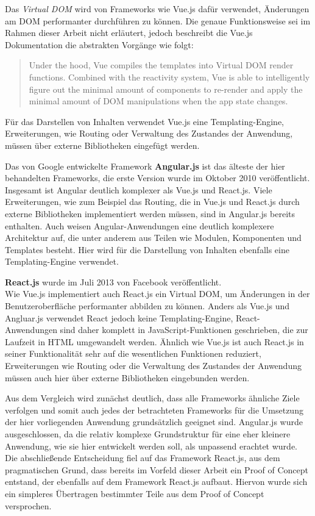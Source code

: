 Das \textit{Virtual DOM} wird von Frameworks wie Vue.js dafür verwendet, Änderungen am DOM performanter durchführen zu können. Die genaue Funktionsweise sei im Rahmen dieser Arbeit nicht erläutert, jedoch beschreibt die Vue.js Dokumentation die abstrakten Vorgänge wie folgt:

\begin{quote}
  Under the hood, Vue compiles the templates into Virtual DOM render functions. Combined with the reactivity system, Vue is able to intelligently figure out the minimal amount of components to re-render and apply the minimal amount of DOM manipulations when the app state changes. \cite{VueTemplate}
\end{quote}

Für das Darstellen von Inhalten verwendet Vue.js eine Templating-Engine, Erweiterungen, wie Routing oder Verwaltung des Zustandes der Anwendung, müssen über externe Bibliotheken eingefügt werden.

Das von Google entwickelte Framework \textbf{Angular.js} \cite{angular} ist das älteste der hier behandelten Frameworks, die erste Version wurde im Oktober 2010 veröffentlicht.\\
Insgesamt ist Angular deutlich komplexer als Vue.js und React.js. Viele Erweiterungen, wie zum Beispiel das Routing, die in Vue.js und React.js durch externe Bibliotheken implementiert werden müssen, sind in Angular.js bereits enthalten.
Auch weisen Angular-Anwendungen eine deutlich komplexere Architektur auf, die unter anderem aus Teilen wie Modulen, Komponenten und Templates besteht. Hier wird für die Darstellung von Inhalten ebenfalls eine Templating-Engine verwendet.

\textbf{React.js} \cite{react} wurde im Juli 2013 von Facebook veröffentlicht.\\
Wie Vue.js implementiert auch React.js ein Virtual DOM, um Änderungen in der Benutzeroberfläche performanter abbilden zu können.
Anders als Vue.js und Angluar.js verwendet React jedoch keine Templating-Engine, React-Anwendungen sind daher komplett in JavaScript-Funktionen geschrieben, die zur Laufzeit in HTML umgewandelt werden.
Ähnlich wie Vue.js ist auch React.js in seiner Funktionalität sehr auf die wesentlichen Funktionen reduziert, Erweiterungen wie Routing oder die Verwaltung des Zustandes der Anwendung müssen auch hier über externe Bibliotheken eingebunden werden.

Aus dem Vergleich wird zunächst deutlich, dass alle Frameworks ähnliche Ziele verfolgen und somit auch jedes der betrachteten Frameworks für die Umsetzung der hier vorliegenden Anwendung grundsätzlich geeignet sind.
Angular.js wurde ausgeschlossen, da die relativ komplexe Grundstruktur für eine eher kleinere Anwendung, wie sie hier entwickelt werden soll, als unpassend erachtet wurde.
Die abschließende Entscheidung fiel auf das Framework React.js, aus dem pragmatischen Grund, dass bereits im Vorfeld dieser Arbeit ein Proof of Concept entstand, der ebenfalls auf dem Framework React.js aufbaut. Hiervon wurde sich ein simpleres Übertragen bestimmter Teile aus dem Proof of Concept versprochen.


